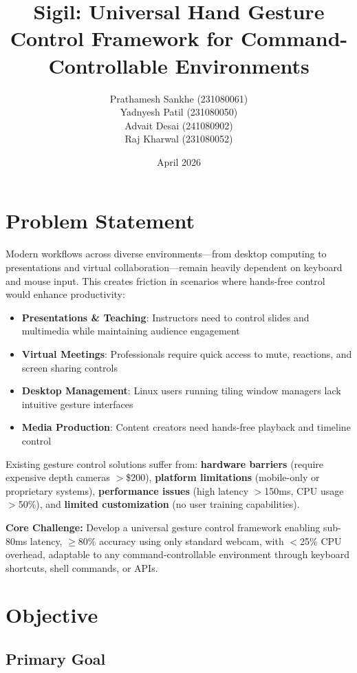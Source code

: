 \documentclass[11pt]{article}
\title{\vspace{-1.5em}\textbf{Sigil: Universal Hand Gesture Control Framework for Command-Controllable Environments}\vspace{-0.5em}}
\author{
  Prathamesh Sankhe (231080061) \\
  Yadnyesh Patil (231080050) \\
  Advait Desai (241080902) \\
  Raj Kharwal (231080052)
}
\date{April 2026}
\begin{document}
\maketitle
\vspace{-1em}

\section{Problem Statement}

Modern workflows across diverse environments—from desktop computing to presentations and virtual collaboration—remain heavily dependent on keyboard and mouse input. This creates friction in scenarios where hands-free control would enhance productivity:

\begin{itemize}
\item \textbf{Presentations \& Teaching}: Instructors need to control slides and multimedia while maintaining audience engagement
\item \textbf{Virtual Meetings}: Professionals require quick access to mute, reactions, and screen sharing controls
\item \textbf{Desktop Management}: Linux users running tiling window managers lack intuitive gesture interfaces
\item \textbf{Media Production}: Content creators need hands-free playback and timeline control
\end{itemize}

Existing gesture control solutions suffer from: \textbf{hardware barriers} (require expensive depth cameras $>$\$200), \textbf{platform limitations} (mobile-only or proprietary systems), \textbf{performance issues} (high latency $>$150ms, CPU usage $>$50\%), and \textbf{limited customization} (no user training capabilities).

\textbf{Core Challenge:} Develop a universal gesture control framework enabling sub-80ms latency, $\geq$80\% accuracy using only standard webcam, with $<$25\% CPU overhead, adaptable to any command-controllable environment through keyboard shortcuts, shell commands, or APIs.

\section{Objective}

\subsection{Primary Goal}
\end{document}
